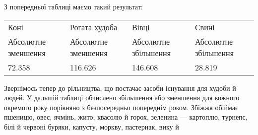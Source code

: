 З попередньої таблиці маємо такий результат:
\begin{center}
  \noindent\begin{tabularx}{\textwidth}{Y Y Y Y}
      Коні & Рогата худоба & Вівці & Свині \\
      Абсолютне зменшення & Абсолютне зменшення & Абсолютне збільшення & Абсолютне збільшення \\
      \num{72.358} & \num{116.626} & \num{146.608} & \num{28.819}\\

  \end{tabularx}
\end {center}

Звернімось тепер до рільництва, що постачає засоби існування
для худоби й людей. У дальшій таблиці обчислено збільшення
або зменшення для кожного окремого року порівняно з безпосередньо
попереднім роком. Збіжжя обіймає пшеницю, овес,
ячмінь, жито, квасолю й горох, зеленина — картоплю, турнепс,
білі й червоні буряки, капусту, моркву, пастернак, вику й~

\setlength{\tabcolsep}{2pt}

